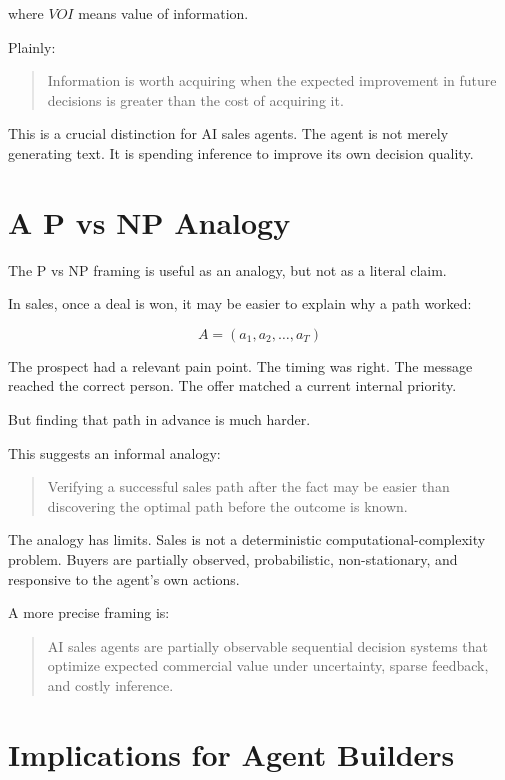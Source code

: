 \documentclass[12pt]{article}
\begin{document}
where \(VOI\) means value of information.

Plainly:

\begin{quote}
    Information is worth acquiring when the expected improvement in future
    decisions is greater than the cost of acquiring it.
\end{quote}

This is a crucial distinction for AI sales agents. The agent is not merely
generating text. It is spending inference to improve its own decision quality.

\section{A P vs NP Analogy}

The P vs NP framing is useful as an analogy, but not as a literal claim.

In sales, once a deal is won, it may be easier to explain why a path worked:

\[
A = (a_1, a_2, \ldots, a_T)
\]

The prospect had a relevant pain point. The timing was right. The message reached
the correct person. The offer matched a current internal priority.

But finding that path in advance is much harder.

This suggests an informal analogy:

\begin{quote}
    Verifying a successful sales path after the fact may be easier than
    discovering the optimal path before the outcome is known.
\end{quote}

The analogy has limits. Sales is not a deterministic computational-complexity
problem. Buyers are partially observed, probabilistic, non-stationary, and
responsive to the agent's own actions.

A more precise framing is:

\begin{quote}
    AI sales agents are partially observable sequential decision systems that
    optimize expected commercial value under uncertainty, sparse feedback, and
    costly inference.
\end{quote}

\section{Implications for Agent Builders}
\end{document}
